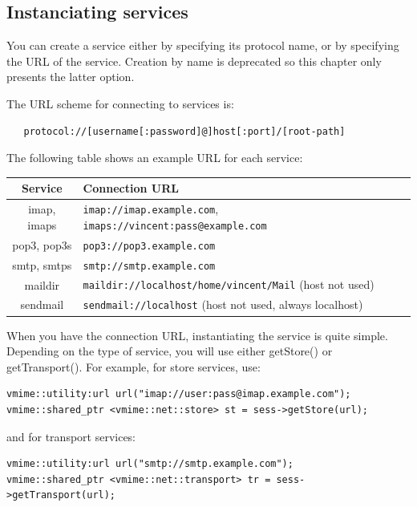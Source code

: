 \subsection{Instanciating services} %

You can create a service either by specifying its protocol name, or by
specifying the URL of the service. Creation by name is deprecated so
this chapter only presents the latter option.

The URL scheme for connecting to services is:

\begin{verbatim}
   protocol://[username[:password]@]host[:port]/[root-path]
\end{verbatim}


The following table shows an example URL for each service:

\noindent\begin{tabularx}{1.0\textwidth}{|c|X|}
\hline
	{\bf Service} &
	{\bf Connection URL} \\
\hline
imap, imaps & {\tt imap://imap.example.com},
{\tt imaps://vincent:pass@example.com} \\
\hline
pop3, pop3s & {\tt pop3://pop3.example.com} \\
\hline
smtp, smtps & {\tt smtp://smtp.example.com} \\
\hline
maildir & {\tt maildir://localhost/home/vincent/Mail} (host not used) \\
\hline
sendmail & {\tt sendmail://localhost} (host not used, always localhost) \\
\hline
\end{tabularx}

\newpage

When you have the connection URL, instantiating the service is quite simple.
Depending on the type of service, you will use either {\vcode getStore()} or
{\vcode getTransport()}. For example, for store services, use:

\begin{lstlisting}
vmime::utility:url url("imap://user:pass@imap.example.com");
vmime::shared_ptr <vmime::net::store> st = sess->getStore(url);
\end{lstlisting}

and for transport services:

\begin{lstlisting}
vmime::utility:url url("smtp://smtp.example.com");
vmime::shared_ptr <vmime::net::transport> tr = sess->getTransport(url);
\end{lstlisting}


